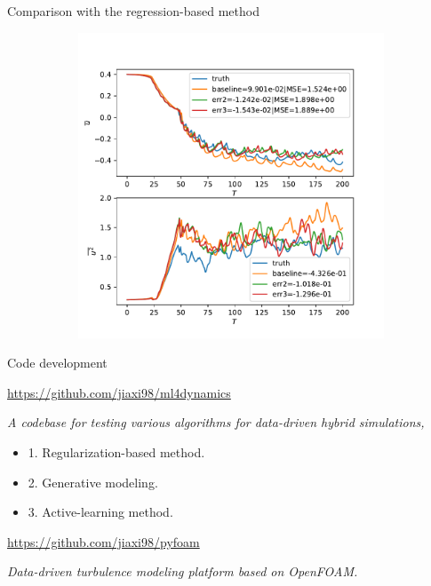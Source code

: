 \documentclass[aspectratio=169]{beamer}
\begin{document}
\begin{frame}{Comparison with the regression-based method}
\begin{figure}[ht]
\begin{subfigure}[b]{0.38\textwidth}
				\includegraphics[width=\textwidth]
				{fig/ks_nu1_N1023n10_gaussian_cmp_stats.pdf}
		\end{subfigure}
		\label{fig:cmp_stats1}
	\end{figure}
\end{frame}


\begin{frame}{Code development}

	\url{https://github.com/jiaxi98/ml4dynamics}

	\textit{A codebase for testing various algorithms for data-driven hybrid simulations,}
	\begin{itemize}
		\item 1. Regularization-based method.
		\item 2. Generative modeling.
		\item 3. Active-learning method.
	\end{itemize}

	
	\url{https://github.com/jiaxi98/pyfoam}

	\textit{Data-driven turbulence modeling platform based on OpenFOAM.}
\end{frame}
\end{document}
